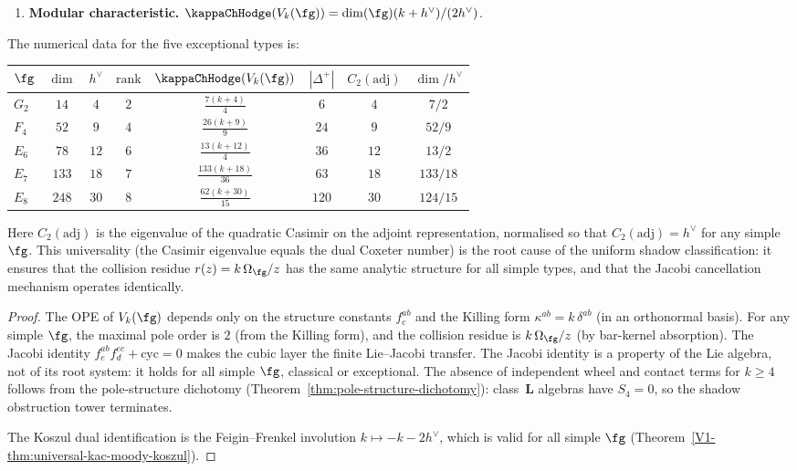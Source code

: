 \begin{proposition}
\begin{enumerate}[label=\textup{(\roman*)},nosep]
\item \textbf{Modular characteristic.}
 $\kappaChHodge(V_k(\fg)) = \dim(\fg)(k + h^\vee)/(2h^\vee)$.
\end{enumerate}
The numerical data for the five exceptional types is:
\begin{center}
\renewcommand{\arraystretch}{1.3}
\small
\begin{tabular}{lccccccc}
$\fg$ & $\dim$ & $h^\vee$ & $\mathrm{rank}$
 & $\kappaChHodge(V_k(\fg))$
 & $|\Delta^+|$
 & $C_2(\mathrm{adj})$
 & $\dim/h^\vee$ \\
\hline
$G_2$ & $14$ & $4$ & $2$
 & $\frac{7(k+4)}{4}$
 & $6$ & $4$ & $7/2$ \\
$F_4$ & $52$ & $9$ & $4$
 & $\frac{26(k+9)}{9}$
 & $24$ & $9$ & $52/9$ \\
$E_6$ & $78$ & $12$ & $6$
 & $\frac{13(k+12)}{4}$
 & $36$ & $12$ & $13/2$ \\
$E_7$ & $133$ & $18$ & $7$
 & $\frac{133(k+18)}{36}$
 & $63$ & $18$ & $133/18$ \\
$E_8$ & $248$ & $30$ & $8$
 & $\frac{62(k+30)}{15}$
 & $120$ & $30$ & $124/15$
\end{tabular}
\end{center}
Here $C_2(\mathrm{adj})$ is the eigenvalue of the quadratic
Casimir on the adjoint representation,
normalised so that $C_2(\mathrm{adj}) = h^\vee$ for any
simple~$\fg$. This universality
(the Casimir eigenvalue equals the dual Coxeter number)
is the root cause of the uniform shadow classification:
it ensures that the collision residue
$r(z) = k\,\Omega_\fg/z$ has the same analytic structure
for all simple types, and that the Jacobi cancellation
mechanism operates identically.
\end{proposition}

\begin{proof}
The OPE of $V_k(\fg)$ depends only on the structure constants
$f^{ab}_c$ and the Killing form $\kappa^{ab} = k\,\delta^{ab}$
(in an orthonormal basis). For any simple $\fg$, the maximal
pole order is $2$ (from the Killing form), and the collision residue
is $k\,\Omega_\fg/z$ (by bar-kernel absorption). The Jacobi
identity $f^{ab}_e f^{ec}_d + \mathrm{cyc} = 0$ makes the cubic layer
the finite Lie--Jacobi transfer. The Jacobi identity is a property of the Lie algebra,
not of its root system: it holds for all simple $\fg$, classical
or exceptional. The absence of independent wheel and contact terms
for $k \ge 4$ follows from the pole-structure dichotomy
(Theorem~\ref{thm:pole-structure-dichotomy}): class~$\mathbf{L}$
algebras have $S_4 = 0$, so the shadow obstruction tower terminates.

The Koszul dual identification is the Feigin--Frenkel involution
$k \mapsto -k - 2h^\vee$, which is valid for all simple $\fg$
(Theorem~\ref*{V1-thm:universal-kac-moody-koszul}).
\end{proof}


